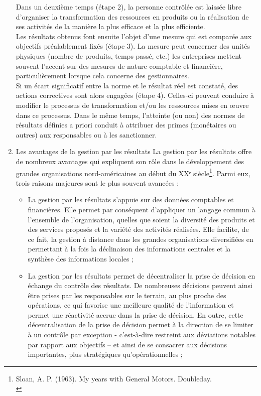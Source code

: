 \documentclass{tufte-handout}
\begin{document}
\begin{enumerate}
 Dans un deuxième temps (étape 2), la personne contrôlée est laissée libre d’organiser la transformation des ressources en produits ou la réalisation de ses activités de la manière la plus efficace et la plus efficiente.\\
Les résultats obtenus font ensuite l’objet d’une mesure qui est comparée aux objectifs préalablement fixés (étape 3). La mesure peut concerner des unités physiques (nombre de produits, temps passé, etc.) les entreprises mettent souvent l’accent sur des mesures de nature comptable et financière, particulièrement lorsque cela concerne des gestionnaires.\\
Si un écart significatif entre la norme et le résultat réel est constaté, des actions correctives sont alors engagées (étape 4). Celles-ci peuvent conduire à modifier le processus de transformation et/ou les ressources mises en œuvre dans ce processus. Dans le même temps, l’atteinte (ou non) des normes de résultats définies a priori conduit à attribuer des primes (monétaires ou autres) aux responsables ou à les sanctionner.\\
\item Les avantages de la gestion par les résultats
\label{sec:org9667a95}
La gestion par les résultats offre de nombreux avantages qui expliquent son rôle dans le développement des grandes organisations nord-américaines au début du XXᵉ siècle\footnote{Sloan, A. P. (1963). My years with General Motors. Doubleday.\\}. Parmi eux, trois raisons majeures sont le plus souvent avancées :\\
\begin{itemize}
\item La gestion par les résultats s’appuie sur des données comptables et financières. Elle permet par conséquent d’appliquer un langage commun à l’ensemble de l’organisation, quelles que soient la diversité des produits et des services proposés et la variété des activités réalisées. Elle facilite, de ce fait, la gestion à distance dans les grandes organisations diversifiées en permettant à la fois la déclinaison des informations centrales et la synthèse des informations locales ;\\
\item La gestion par les résultats permet de décentraliser la prise de décision en échange du contrôle des résultats. De nombreuses décisions peuvent ainsi être prises par les responsables sur le terrain, au plus proche des opérations, ce qui favorise une meilleure qualité de l’information et permet une réactivité accrue dans la prise de décision. En outre, cette décentralisation de la prise de décision permet à la direction de se limiter à un contrôle par exception - c’est-à-dire restreint aux déviations notables par rapport aux objectifs – et ainsi de se consacrer aux décisions importantes, plus stratégiques qu’opérationnelles ;\\

\end{itemize}
\end{enumerate}
\end{document}
